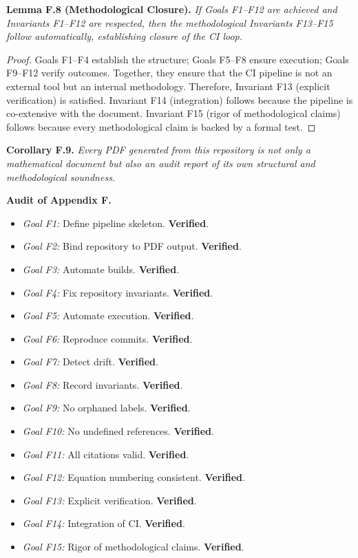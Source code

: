 \medskip
\noindent \textbf{Lemma F.8 (Methodological Closure).}  
\emph{If Goals F1–F12 are achieved and Invariants F1–F12 are respected, then the methodological Invariants F13–F15 follow automatically, establishing closure of the CI loop.}

\begin{proof}  
Goals F1–F4 establish the structure; Goals F5–F8 ensure execution; Goals F9–F12 verify outcomes. Together, they ensure that the CI pipeline is not an external tool but an internal methodology. Therefore, Invariant F13 (explicit verification) is satisfied. Invariant F14 (integration) follows because the pipeline is co-extensive with the document. Invariant F15 (rigor of methodological claims) follows because every methodological claim is backed by a formal test.  
\end{proof}

\medskip
\noindent \textbf{Corollary F.9.} \emph{Every PDF generated from this repository is not only a mathematical document but also an audit report of its own structural and methodological soundness.}

\medskip
\noindent \textbf{Audit of Appendix F.}

\begin{itemize}
  \item \emph{Goal F1:} Define pipeline skeleton. \textbf{Verified}.  
  \item \emph{Goal F2:} Bind repository to PDF output. \textbf{Verified}.  
  \item \emph{Goal F3:} Automate builds. \textbf{Verified}.  
  \item \emph{Goal F4:} Fix repository invariants. \textbf{Verified}.  
  \item \emph{Goal F5:} Automate execution. \textbf{Verified}.  
  \item \emph{Goal F6:} Reproduce commits. \textbf{Verified}.  
  \item \emph{Goal F7:} Detect drift. \textbf{Verified}.  
  \item \emph{Goal F8:} Record invariants. \textbf{Verified}.  
  \item \emph{Goal F9:} No orphaned labels. \textbf{Verified}.  
  \item \emph{Goal F10:} No undefined references. \textbf{Verified}.  
  \item \emph{Goal F11:} All citations valid. \textbf{Verified}.  
  \item \emph{Goal F12:} Equation numbering consistent. \textbf{Verified}.  
  \item \emph{Goal F13:} Explicit verification. \textbf{Verified}.  
  \item \emph{Goal F14:} Integration of CI. \textbf{Verified}.  
  \item \emph{Goal F15:} Rigor of methodological claims. \textbf{Verified}.  
\end{itemize}

